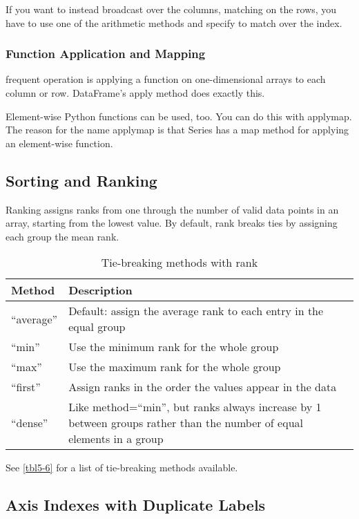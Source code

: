 If you want to instead broadcast over the columns, matching on the rows, you have to use one of the arithmetic methods and specify to match over the index.
\subsubsection*{Function Application and Mapping}
frequent operation is applying a function on one-dimensional arrays to each column or row. DataFrame's apply method does exactly this.

Element-wise Python functions can be used, too. You can do this with applymap. The reason for the name applymap is that Series has a map method for applying an element-wise function.
\subsection{Sorting and Ranking}
Ranking assigns ranks from one through the number of valid data points in an array, starting from the lowest value. By default, rank breaks ties by assigning each group the mean rank.


\begin{table}
    \centering
    \caption{Tie-breaking methods with rank}
    \label{tbl5-6}
    \begin{tabularx}{\textwidth}{lX}
        \hline
        Method      & Description                                                                                                            \\
        \hline
        ``average'' & Default: assign the average rank to each entry in the equal group                                                      \\
        ``min''     & Use the minimum rank for the whole group                                                                               \\
        ``max''     & Use the maximum rank for the whole group                                                                               \\
        ``first''   & Assign ranks in the order the values appear in the data                                                                \\
        ``dense''   & Like method=``min'', but ranks always increase by 1 between groups rather than the number of equal elements in a group \\
        \hline
    \end{tabularx}
\end{table}
See \autoref{tbl5-6} for a list of tie-breaking methods available.
\subsection{Axis Indexes with Duplicate Labels}